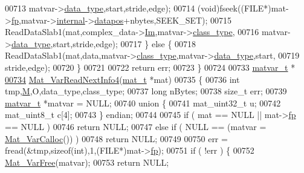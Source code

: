 \begin{DoxyCode}
{{{00713                           matvar->\hyperlink{group___m_a_t_ab6aafe9bd77f0f077852593dec438144}{data\_type},start,stride,edge);
00714             (void)fseek((FILE*)mat->\hyperlink{struct__mat__t_a85f562e407ca9ad4d2a6e14f839432b7}{fp},matvar->\hyperlink{group___m_a_t_a6e97e3ed9f40c49322c18561c2a94e92}{internal}->\hyperlink{structmatvar__internal_afd3bfaab126a160bd6855563e1ea0a7e}{datapos}+nbytes,SEEK\_SET);
00715             ReadDataSlab1(mat,complex\_data->\hyperlink{group___m_a_t_a7182d10b0d3598415887376065440946}{Im},matvar->\hyperlink{group___m_a_t_aff13035bf3265dd7d9425e5d40c839d4}{class\_type},
00716                           matvar->\hyperlink{group___m_a_t_ab6aafe9bd77f0f077852593dec438144}{data\_type},start,stride,edge);
00717     \} \textcolor{keywordflow}{else} \{
00718         ReadDataSlab1(mat,data,matvar->\hyperlink{group___m_a_t_aff13035bf3265dd7d9425e5d40c839d4}{class\_type},matvar->\hyperlink{group___m_a_t_ab6aafe9bd77f0f077852593dec438144}{data\_type},start,
00719                       stride,edge);
00720     \}
00721 
00722     \textcolor{keywordflow}{return} err;
00723 \}
00724 
00733 \hyperlink{group___m_a_t_structmatvar__t}{matvar\_t} *
\hyperlink{mat4_8c_a494a64be8f002874f2048687561f65d3}{00734} \hyperlink{mat4_8c_a494a64be8f002874f2048687561f65d3}{Mat\_VarReadNextInfo4}(\hyperlink{struct__mat__t}{mat\_t} *mat)
00735 \{
00736     \textcolor{keywordtype}{int}       tmp,\hyperlink{group___core___module_class_eigen_1_1_matrix}{M},O,data\_type,class\_type;
00737     \textcolor{keywordtype}{long}      nBytes;
00738     \textcolor{keywordtype}{size\_t}    err;
00739     \hyperlink{group___m_a_t_structmatvar__t}{matvar\_t} *matvar = NULL;
00740     \textcolor{keyword}{union }\{
00741         mat\_uint32\_t u;
00742         mat\_uint8\_t  c[4];
00743     \} endian;
00744 
00745     \textcolor{keywordflow}{if} ( mat == NULL || mat->\hyperlink{struct__mat__t_a85f562e407ca9ad4d2a6e14f839432b7}{fp} == NULL )
00746         \textcolor{keywordflow}{return} NULL;
00747     \textcolor{keywordflow}{else} \textcolor{keywordflow}{if} ( NULL == (matvar = \hyperlink{group___m_a_t_gae7c9c3699f6e9c31a9c490300013098c}{Mat\_VarCalloc}()) )
00748         \textcolor{keywordflow}{return} NULL;
00749 
00750     err = fread(&tmp,\textcolor{keyword}{sizeof}(\textcolor{keywordtype}{int}),1,(FILE*)mat->\hyperlink{struct__mat__t_a85f562e407ca9ad4d2a6e14f839432b7}{fp});
00751     \textcolor{keywordflow}{if} ( !err ) \{
00752         \hyperlink{group___m_a_t_ga1d14716f7450530fd1c9d02413787f0e}{Mat\_VarFree}(matvar);
00753         \textcolor{keywordflow}{return} NULL;
}}}
\end{DoxyCode}
